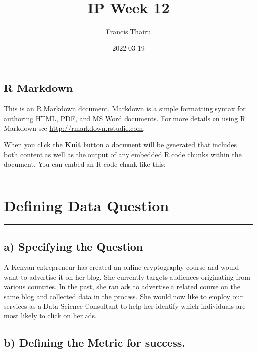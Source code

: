 \documentclass[
]{article}
\title{IP Week 12}
\author{Francis Thairu}
\date{2022-03-19}
\begin{document}
\maketitle

\hypertarget{r-markdown}{%
\subsection{R Markdown}\label{r-markdown}}

This is an R Markdown document. Markdown is a simple formatting syntax
for authoring HTML, PDF, and MS Word documents. For more details on
using R Markdown see \url{http://rmarkdown.rstudio.com}.

When you click the \textbf{Knit} button a document will be generated
that includes both content as well as the output of any embedded R code
chunks within the document. You can embed an R code chunk like this:

\begin{center}\rule{0.5\linewidth}{0.5pt}\end{center}

\hypertarget{defining-data-question}{%
\section{Defining Data Question}\label{defining-data-question}}

\begin{center}\rule{0.5\linewidth}{0.5pt}\end{center}

\hypertarget{a-specifying-the-question}{%
\subsection{a) Specifying the
Question}\label{a-specifying-the-question}}

A Kenyan entrepreneur has created an online cryptography course and
would want to advertise it on her blog. She currently targets audiences
originating from various countries. In the past, she ran ads to
advertise a related course on the same blog and collected data in the
process. She would now like to employ our services as a Data Science
Consultant to help her identify which individuals are most likely to
click on her ads.

\hypertarget{b-defining-the-metric-for-success.}{%
\subsection{b) Defining the Metric for
success.}\label{b-defining-the-metric-for-success.}}
\end{document}
